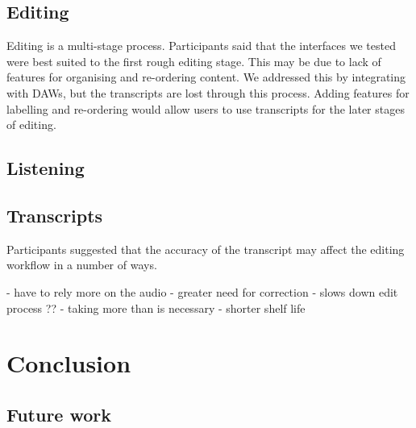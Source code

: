 

\subsection{Editing}

Editing is a multi-stage process. Participants said that the interfaces we tested were best suited to the first rough
editing stage. This may be due to lack of features for organising and re-ordering content. We addressed this by
integrating with DAWs, but the transcripts are lost through this process. Adding features for labelling and re-ordering
would allow users to use transcripts for the later stages of editing.

\subsection{Listening}

\subsection{Transcripts}

Participants suggested that the accuracy of the transcript may affect the editing workflow in a number of ways. 

- have to rely more on the audio
- greater need for correction
- slows down edit process ??
- taking more than is necessary
- shorter shelf life





\section{Conclusion}\label{sec:paper-conclusion}

\subsection{Future work}
